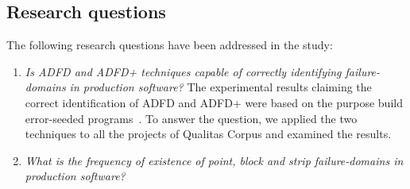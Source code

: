 \documentclass[runningheads,a4paper]{llncs}
\begin{document}
\subsection{Research questions} \label{sec:questions}
The following research questions have been addressed in the study:
\begin{enumerate}
%
\item \textit{Is ADFD and ADFD+ techniques capable of correctly identifying failure-domains in production software?} The experimental results claiming the correct identification of ADFD and ADFD+ were based on the purpose build error-seeded programs~\cite{}. To answer the question, we applied the two techniques to all the projects of Qualitas Corpus and examined the results.
%
\item \textit{What is the frequency of existence of point, block and strip failure-domains in production software?}


\end{enumerate}
\end{document}

